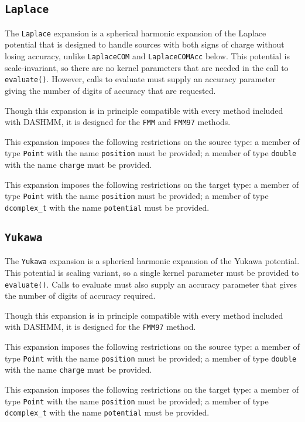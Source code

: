 \subsection{\texttt{Laplace}}

The \texttt{Laplace} expansion is a spherical harmonic expansion of the Laplace
potential that is designed to handle sources with both signs of charge without
losing accuracy, unlike \texttt{LaplaceCOM} and \texttt{LaplaceCOMAcc} below.
This potential is scale-invariant, so there are no kernel parameters that are
needed in the call to \texttt{evaluate()}. However, calls to evaluate must
supply an accuracy parameter giving the number of digits of accuracy that are
requested.

Though this expansion is in principle compatible with every method included
with DASHMM, it is designed for the \texttt{FMM} and \texttt{FMM97} methods.

This expansion imposes the following restrictions on the source type: a
member of type \texttt{Point} with the name \texttt{position} must be provided;
a member of type \texttt{double} with the name \texttt{charge} must be
provided.

This expansion imposes the following restrictions on the target type: a
member of type \texttt{Point} with the name \texttt{position} must be provided;
a member of type \texttt{dcomplex\_t} with the name \texttt{potential}
must be provided.

\subsection{\texttt{Yukawa}}

The \texttt{Yukawa} expansion is a spherical harmonic expansion of the Yukawa
potential. This potential is scaling variant, so a single kernel parameter
must be provided to \texttt{evaluate()}. Calls to evaluate must also supply an
accuracy parameter that gives the number of digits of accuracy required.

Though this expansion is in principle compatible with every method included
with DASHMM, it is designed for the \texttt{FMM97} method.

This expansion imposes the following restrictions on the source type: a
member of type \texttt{Point} with the name \texttt{position} must be provided;
a member of
type \texttt{double} with the name \texttt{charge} must be provided.

This expansion imposes the following restrictions on the target type: a
member of type \texttt{Point} with the name \texttt{position} must be provided;
a member of type \texttt{dcomplex\_t} with the name \texttt{potential}
 must be provided.


